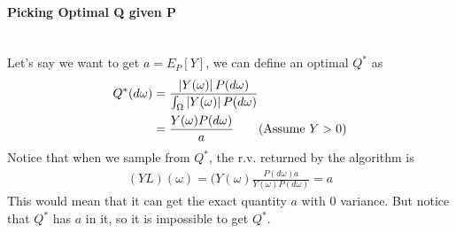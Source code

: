 \paragraph{Picking Optimal Q given P} \mbox{}\\
Let's say we want to get $a = E_P[Y]$, we can define an optimal $Q^*$ as 
    \begin{align*}
        Q^*(d\omega) 
        & = \frac{\left| Y(\omega) \right| P(d\omega)}{\int_{\Omega} \left| Y(\omega) \right|P(d\omega)} \\
        & = \frac{Y(\omega) P(d\omega)}{a} \tag{Assume $Y > 0$}
    \end{align*}
Notice that when we sample from $Q^*$, the r.v. returned by the algorithm is 
    \begin{align*}
        (Y L)(\omega) = (Y(\omega) \frac{P(d\omega) a }{Y(\omega) P(d\omega)} = a
    \end{align*}
This would mean that it can get the exact quantity $a$ with 0 variance. But notice that $Q^*$ has $a$ in it, so it is impossible to get $Q^*$. 